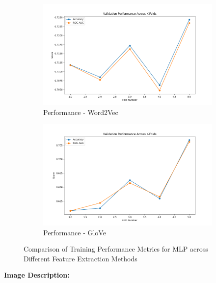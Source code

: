 \begin{figure}[H]
    \begin{subfigure}[b]{0.48\textwidth}
        \includegraphics[width=\textwidth]{img/report_info/img/2.2.MLP/best_mlp_word2vec.png}
        \caption{Performance - Word2Vec}
        \label{fig:mlp-word2vec}
    \end{subfigure}
    \begin{subfigure}[b]{0.48\textwidth}
        \includegraphics[width=\textwidth]{img/report_info/img/2.2.MLP/best_mlp_glove.png}
        \caption{Performance - GloVe}
        \label{fig:mlp-glove}
    \end{subfigure}
    
    \caption{Comparison of Training Performance Metrics for MLP across Different Feature Extraction Methods}
    \label{fig:mlp-performance-group}
\end{figure}

\textbf{Image Description:}

